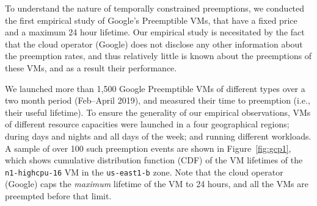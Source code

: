 To understand the nature of temporally constrained preemptions, we conducted the first empirical study of Google's Preemptible VMs, that have a fixed price and a maximum 24 hour lifetime.
Our empirical study is necesitated by the fact that the cloud operator (Google) does not disclose any other information about the preemption rates, and thus relatively little is known about the preemptions of these VMs, and as a result their performance.


We launched more than 1,500 Google Preemptible VMs of different types over a two month period (Feb--April 2019), and measured their time to preemption (i.e., their useful lifetime).\footnotemark
To ensure the generality of our empirical observations, VMs of different resource capacities were launched in a four geographical regions; during days and nights and all days of the week; and running different workloads. 
%
%
A sample of over 100 such preemption events are shown in Figure~\ref{fig:gcp1}, which shows cumulative distribution function (CDF) of the VM lifetimes of the \texttt{n1-highcpu-16} VM in the \texttt{us-east1-b} zone. 
Note that the cloud operator (Google) caps the \emph{maximum} lifetime of the VM to 24 hours, and all the VMs are preempted before that limit. 

